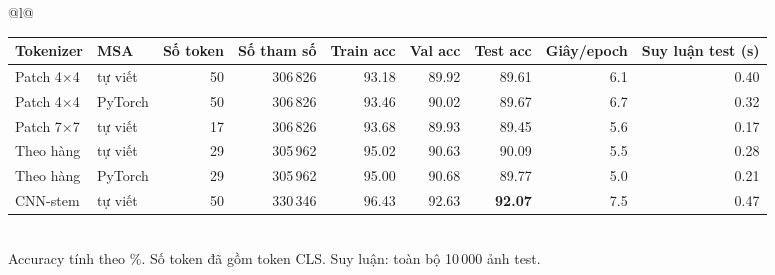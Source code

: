 \begin{tabular}{@{}l@{}}
\begin{tabular}{llrrrrrrr}
\toprule
Tokenizer & MSA & Số token & Số tham số & Train acc & Val acc & Test acc & Giây/epoch & Suy luận test (s) \\
\midrule
Patch 4×4 & tự viết & 50 & 306\,826 & 93.18 & 89.92 & 89.61 & 6.1 & 0.40 \\
Patch 4×4 & PyTorch & 50 & 306\,826 & 93.46 & 90.02 & 89.67 & 6.7 & 0.32 \\
Patch 7×7 & tự viết & 17 & 306\,826 & 93.68 & 89.93 & 89.45 & 5.6 & 0.17 \\
Theo hàng & tự viết & 29 & 305\,962 & 95.02 & 90.63 & 90.09 & 5.5 & 0.28 \\
Theo hàng & PyTorch & 29 & 305\,962 & 95.00 & 90.68 & 89.77 & 5.0 & 0.21 \\
CNN-stem & tự viết & 50 & 330\,346 & 96.43 & 92.63 & \textbf{92.07} & 7.5 & 0.47 \\
\bottomrule
\end{tabular}
\\[2pt]
{\footnotesize Accuracy tính theo \%. Số token đã gồm token CLS. Suy luận: toàn bộ 10\,000 ảnh test.}
\end{tabular}
